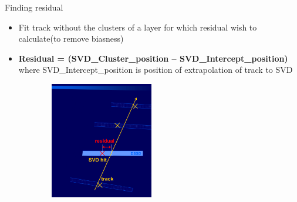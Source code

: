 \documentclass[xcolor=dvipsnames]{beamer}
\begin{document}
\begin{frame}{Finding residual}
	\begin{multicols}{2}
		\begin{itemize}
			\item  Fit track without the clusters of a layer for which residual wish to calculate(to remove biasness)
			\item \textbf{ Residual = (SVD\_Cluster\_position -- SVD\_Intercept\_position)}\\
			where SVD\_Intercept\_position is position of extrapolation of track to SVD		
		\end{itemize}
		\begin{figure}[H]		
			\begin{center}
				\begin{subfigure}[b]{0.30\textwidth}
					\includegraphics[width=4.5cm]{hit.png}
				\end{subfigure}\\
			\end{center}
		\end{figure}
	\end{multicols}		
\end{frame}
\end{document}
